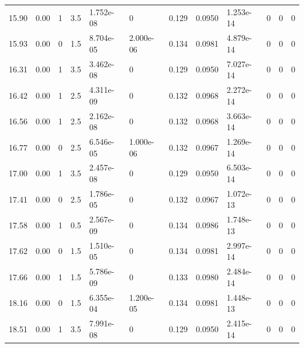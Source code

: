 \documentclass[preview]{standalone}
\begin{document}
{{{\begin{tabular}{L{1.2cm}C{1.2cm} C{0.3cm}C{0.5cm} C{1.4cm}C{1.4cm} C{1.4cm}C{1.4cm} C{1.6cm}C{1.6cm} C{1.6cm}C{1.6cm}}
  15.90  &  0.00  & 1     & 3.5 &  1.752e-08  & 0  &  0.129&   0.0950& 1.253e-14 & 0   &  0 & 0  \\ 
  15.93  &  0.00  & 0     & 1.5 &  8.704e-05  & 2.000e-06  &  0.134&   0.0981& 4.879e-14 & 0   &  0 & 0  \\ 
  16.31  &  0.00  & 1     & 3.5 &  3.462e-08  & 0  &  0.129&   0.0950& 7.027e-14 & 0   &  0 & 0  \\ 
  16.42  &  0.00  & 1     & 2.5 &  4.311e-09  & 0  &  0.132&   0.0968& 2.272e-14 & 0   &  0 & 0  \\ 
  16.56  &  0.00  & 1     & 2.5 &  2.162e-08  & 0  &  0.132&   0.0968& 3.663e-14 & 0   &  0 & 0  \\ 
  16.77  &  0.00  & 0     & 2.5 &  6.546e-05  & 1.000e-06  &  0.132&   0.0967& 1.269e-14 & 0   &  0 & 0  \\ 
  17.00  &  0.00  & 1     & 3.5 &  2.457e-08  & 0  &  0.129&   0.0950& 6.503e-14 & 0   &  0 & 0  \\ 
  17.41  &  0.00  & 0     & 2.5 &  1.786e-05  & 0  &  0.132&   0.0967& 1.072e-13 & 0   &  0 & 0  \\ 
  17.58  &  0.00  & 1     & 0.5 &  2.567e-09  & 0  &  0.134&   0.0986& 1.748e-13 & 0   &  0 & 0  \\ 
  17.62  &  0.00  & 0     & 1.5 &  1.510e-05  & 0  &  0.134&   0.0981& 2.997e-14 & 0   &  0 & 0  \\ 
  17.66  &  0.00  & 1     & 1.5 &  5.786e-09  & 0  &  0.133&   0.0980& 2.484e-14 & 0   &  0 & 0  \\ 
  18.16  &  0.00  & 0     & 1.5 &  6.355e-04  & 1.200e-05  &  0.134&   0.0981& 1.448e-13 & 0   &  0 & 0  \\ 
  18.51  &  0.00  & 1     & 3.5 &  7.991e-08  & 0  &  0.129&   0.0950& 2.415e-14 & 0   &  0 & 0  \\ 
\hline 
\end{tabular} 

}}}
\end{document}
